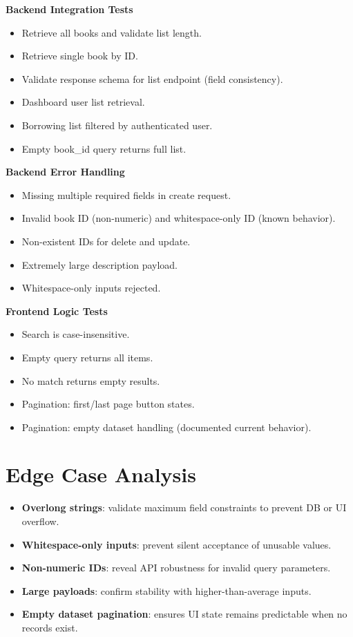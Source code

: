 \documentclass[11pt]{article}
\begin{document}
\textbf{Backend Integration Tests}
\begin{itemize}
    \item Retrieve all books and validate list length.
    \item Retrieve single book by ID.
    \item Validate response schema for list endpoint (field consistency).
    \item Dashboard user list retrieval.
    \item Borrowing list filtered by authenticated user.
    \item Empty book\_id query returns full list.
\end{itemize}

\textbf{Backend Error Handling}
\begin{itemize}
    \item Missing multiple required fields in create request.
    \item Invalid book ID (non-numeric) and whitespace-only ID (known behavior).
    \item Non-existent IDs for delete and update.
    \item Extremely large description payload.
    \item Whitespace-only inputs rejected.
\end{itemize}

\textbf{Frontend Logic Tests}
\begin{itemize}
    \item Search is case-insensitive.
    \item Empty query returns all items.
    \item No match returns empty results.
    \item Pagination: first/last page button states.
    \item Pagination: empty dataset handling (documented current behavior).
\end{itemize}

\section{Edge Case Analysis}
\begin{itemize}
    \item \textbf{Overlong strings}: validate maximum field constraints to prevent DB or UI overflow.
    \item \textbf{Whitespace-only inputs}: prevent silent acceptance of unusable values.
    \item \textbf{Non-numeric IDs}: reveal API robustness for invalid query parameters.
    \item \textbf{Large payloads}: confirm stability with higher-than-average inputs.
    \item \textbf{Empty dataset pagination}: ensures UI state remains predictable when no records exist.
\end{itemize}
\end{document}
